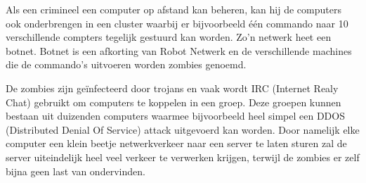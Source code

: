 Als een crimineel een computer op afstand kan beheren, kan hij de computers ook onderbrengen in een cluster waarbij er bijvoorbeeld \'e\'en commando naar 10 verschillende compters tegelijk gestuurd kan worden. Zo'n netwerk heet een botnet. Botnet is een afkorting van Robot Netwerk en de verschillende machines die de commando's uitvoeren worden zombies genoemd.

De zombies zijn ge\"infecteerd door trojans en vaak wordt IRC (Internet Realy Chat) gebruikt om computers te koppelen in een groep. Deze groepen kunnen bestaan uit duizenden computers waarmee bijvoorbeeld heel simpel een DDOS (Distributed Denial Of Service) attack uitgevoerd kan worden. Door namelijk elke computer een klein beetje netwerkverkeer naar een server te laten sturen zal de server uiteindelijk heel veel verkeer te verwerken krijgen, terwijl de zombies er zelf bijna geen last van ondervinden.

